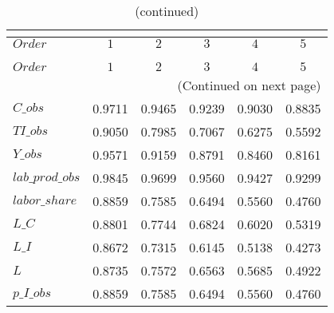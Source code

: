  
\begin{center}
\begin{longtable}{lccccc} 
\caption{COEFFICIENTS OF AUTOCORRELATION}\\
 \label{Table:th_autocorr_matrix}\\
\toprule 
$Order           $	 & 	 $         1$	 & 	 $         2$	 & 	 $         3$	 & 	 $         4$	 & 	 $         5$\\
\midrule \endfirsthead 
\caption{(continued)}\\
 \toprule \\ 
$Order           $	 & 	 $         1$	 & 	 $         2$	 & 	 $         3$	 & 	 $         4$	 & 	 $         5$\\
\midrule \endhead 
\midrule \multicolumn{6}{r}{(Continued on next page)} \\ \bottomrule \endfoot 
\bottomrule \endlastfoot 
$C\_obs          $	 & 	    0.9711	 & 	    0.9465	 & 	    0.9239	 & 	    0.9030	 & 	    0.8835 \\ 
$TI\_obs         $	 & 	    0.9050	 & 	    0.7985	 & 	    0.7067	 & 	    0.6275	 & 	    0.5592 \\ 
$Y\_obs          $	 & 	    0.9571	 & 	    0.9159	 & 	    0.8791	 & 	    0.8460	 & 	    0.8161 \\ 
$lab\_prod\_obs  $	 & 	    0.9845	 & 	    0.9699	 & 	    0.9560	 & 	    0.9427	 & 	    0.9299 \\ 
$labor\_share    $	 & 	    0.8859	 & 	    0.7585	 & 	    0.6494	 & 	    0.5560	 & 	    0.4760 \\ 
$L\_C            $	 & 	    0.8801	 & 	    0.7744	 & 	    0.6824	 & 	    0.6020	 & 	    0.5319 \\ 
$L\_I            $	 & 	    0.8672	 & 	    0.7315	 & 	    0.6145	 & 	    0.5138	 & 	    0.4273 \\ 
$L               $	 & 	    0.8735	 & 	    0.7572	 & 	    0.6563	 & 	    0.5685	 & 	    0.4922 \\ 
$p\_I\_obs       $	 & 	    0.8859	 & 	    0.7585	 & 	    0.6494	 & 	    0.5560	 & 	    0.4760 \\ 
\end{longtable}
 \end{center}
